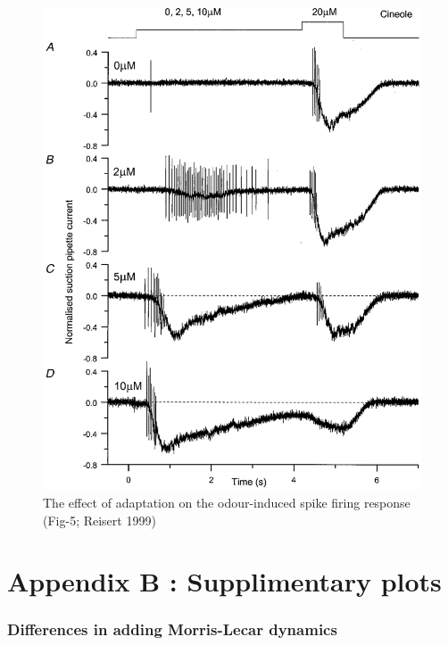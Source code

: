 \documentclass[
]{article}
\begin{document}
\begin{figure}

{\centering \includegraphics[width=0.8\linewidth]{figs/Reisert1999/fig_spk_compare_adaptation_R99_F5} 

}

\caption{The effect of adaptation on the odour-induced spike firing response (Fig-5; Reisert 1999)}\label{fig:r99f5}
\end{figure}

\clearpage

\hypertarget{appendix-b-supplimentary-plots}{%
\section*{Appendix B : Supplimentary plots}\label{appendix-b-supplimentary-plots}}

\hypertarget{differences-in-adding-morris-lecar-dynamics}{%
\subsubsection*{Differences in adding Morris-Lecar dynamics}\label{differences-in-adding-morris-lecar-dynamics}}
\end{document}
